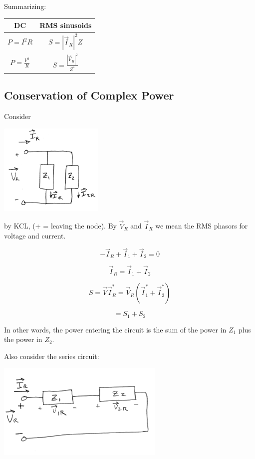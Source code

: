 Summarizing:

\begin{center}
\begin{tabular}{c|c}
DC & RMS sinusoids \\
\hline
$P = I^2 R$ & $S = |\vec{I}_R|^2 Z$ \\
$P = \frac{V^2}{R}$ & $S = \frac{|\vec{V}_R|^2}{Z^*}$ \\
\end{tabular}
\end{center}





\subsection{Conservation of Complex Power}

\noindent Consider

\includegraphics[width=50mm]{figsChapt03/QM27615.png}

by KCL, (+ = leaving the node).   By $\vec V_R$ and $\vec I_R$ we mean
the RMS phasors for voltage and current.

\[
-\vec{I}_R + \vec{I}_{1} + \vec{I}_{2} = 0
\]


\[
\vec{I}_R = \vec{I}_{1} + \vec{I}_{2}
\]

\[
S = \vec{V} \vec{I}_R^* = \vec{V}_R (\vec{I}_{1}^* + \vec{I}_{2}^*)
\]

\[
= S_1 + S_2
\]

In other words, the power entering the circuit is the sum of the power in
$Z_1$ plus the power in $Z_2$.



\noindent Also consider the series circuit:

\includegraphics[width=80mm]{figsChapt03/RQ15238.png}

